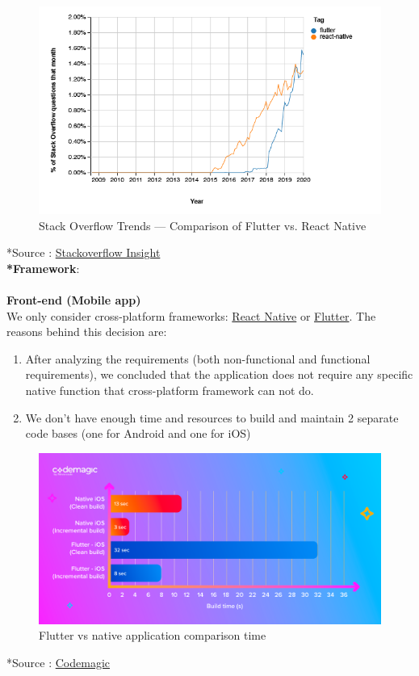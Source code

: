 \documentclass{article}
\begin{document}
\begin{figure}[h!]
    \centering
    \includegraphics[scale=0.7]{Images/MobileTrend.png}
    \caption{Stack Overflow Trends — Comparison of Flutter vs. React Native}
    \label{fig:cookingbook}
\end{figure}
*Source : \href{https://insights.stackoverflow.com/trends?tags=flutter,react-native}{Stackoverflow Insight} \\
\textbf{*Framework}: \\\\
\textbf{Front-end (Mobile app) } \\
\qquad We only consider cross-platform frameworks: \href{https://reactnative.dev}{ React Native} or  \href{https://flutter.dev}{Flutter}. The reasons behind this decision are:
 \begin{enumerate}
        \item After analyzing the requirements (both non-functional and functional requirements), we concluded that the application does not require any specific native function that cross-platform framework can not do.
        \item We don’t have enough time and resources to build and maintain 2 separate code bases (one for Android and one for iOS)
\end{enumerate}
\begin{figure}[h!]
    \centering
    \includegraphics[scale=0.3]{Images/CM_Swift-vs-Flutter_build-time.png}
    \caption{Flutter vs native application comparison time}
    \label{fig:cookingbook}
\end{figure}
*Source : \href{https://blog.codemagic.io/flutter-vs-swift/}{Codemagic} \\\\
\end{document}
